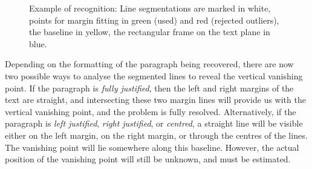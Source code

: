 \begin{figure}[t]
\centering
\begin{center}
\hspace{2mm}
\end{center}
\vspace*{0mm}
\caption{Example of recognition: 
Line segmentations are marked in white, points for margin fitting in green
(used) and red (rejected outliers), the baseline in yellow,
the rectangular frame on the text plane in blue.}
\label{linesegfig}
\label{summaryfig}
\end{figure}



Depending on the formatting of the paragraph being recovered, there are now two
possible ways to analyse the segmented lines to reveal the vertical vanishing
point.  If the paragraph is {\em fully justified}, then the left and right
margins of the text are straight, and intersecting these two margin lines will
provide us with the vertical vanishing point, and the problem is fully resolved.
Alternatively, if the paragraph is {\em left justified}, {\em right justified},
or {\em centred},
a straight line will be visible either on the left margin, on the right margin,
or through the centres of the lines.  The vanishing point will lie somewhere
along this baseline.  However, the actual position of the vanishing point will
still be unknown, and must be estimated.


